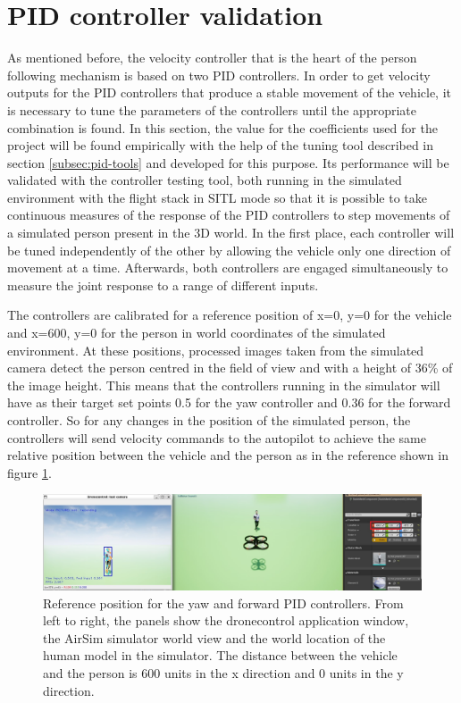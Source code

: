 \section{PID controller validation}
\label{sec:test-1-pid}


As mentioned before, the velocity controller that is the heart of the person following mechanism is based on two PID controllers.
In order to get velocity outputs for the PID controllers that produce a stable movement of the vehicle, it is necessary to tune the parameters of the controllers until the appropriate combination is found.
In this section, the value for the coefficients used for the project will be found empirically with the help of the tuning tool described in section \ref{subsec:pid-tools} and developed for this purpose. Its performance will be validated with the controller testing tool, both running in the simulated environment with the flight stack in SITL mode so that it is possible to take continuous measures of the response of the PID controllers to step movements of a simulated person present in the 3D world.
In the first place, each controller will be tuned independently of the other by allowing the vehicle only one direction of movement at a time.
Afterwards, both controllers are engaged simultaneously to measure the joint response to a range of different inputs.

The controllers are calibrated for a reference position of x=0, y=0 for the vehicle and x=600, y=0 for the person in world coordinates of the simulated environment.
At these positions, processed images taken from the simulated camera detect the person centred in the field of view and with a height of 36\% of the image height.
This means that the controllers running in the simulator will have as their target set points 0.5 for the yaw controller and 0.36 for the forward controller. 
So for any changes in the position of the simulated person, the controllers will send velocity commands to the autopilot to achieve the same relative position between the vehicle and the person as in the reference shown in figure \ref{fig:tune-start-pos}.

\begin{figure}
  \centering
  \includegraphics[width=\textwidth, keepaspectratio]{img/pid/tune-ref-pos.jpg}
  \caption{Reference position for the yaw and forward PID controllers. From left to right, the panels show the dronecontrol application window, the AirSim simulator world view and the world location of the human model in the simulator. The distance between the vehicle and the person is 600 units in the x direction and 0 units in the y direction.}
  \label{fig:tune-start-pos}
\end{figure}


